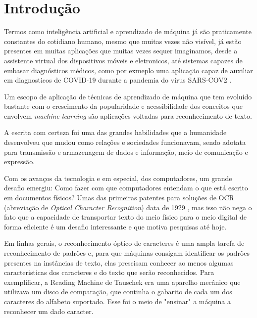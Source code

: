 
\chapter[Introdução]{Introdução}

Termos como inteligência artificial e aprendizado de máquina já são praticamente constantes do cotidiano humano, mesmo que muitas vezes não visível, já estão presentes em muitas aplicações que muitas vezes sequer imaginamos, desde a assistente virtual dos dispositivos móveis e eletronicos, até sistemas capazes de embasar diagnósticos médicos, como por exmeplo uma aplicação capaz de auxiliar em diagnosticos de COVID-19 durante a pandemia do vírus SARS-COV2 \cite{Zhao2021DeepLF}. 

Um escopo de aplicação de técnicas de aprendizado de máquina que tem evoluído bastante com o crescimento da popularidade e acessibilidade dos conceitos que envolvem \textit{machine learning} são aplicações voltadas para reconhecimento de texto.

A escrita com certeza foi uma das grandes habilidades que a humanidade desenvolveu que mudou como relações e sociedades funcionavam, sendo adotata para transmissão e armazenagem de dados e informação, meio de comunicação e expressão.

Com os avanços da tecnologia e em especial, dos computadores, um grande desafio emergiu: Como fazer com que computadores entendam o que está escrito em documentos físicos? Umas das primeiras patentes para soluções de OCR (abreviação de \textit{Optical Character Recognition}) data de 1929 \cite{readingMachine}, mas isso não nega o fato que a capacidade de transportar texto do meio físico para o meio digital de forma eficiente é um desafio interessante e que motiva pesquisas até hoje.

Em linhas gerais, o reconhecimento óptico de caracteres é uma ampla tarefa de reconhecimento de padrões e, para que máquinas consigam identificar os padrões presentes na instâncias de texto, elas prescisam conhecer ao menos algumas caracteristicas dos caracteres e do texto que serão reconhecidos. Para exemplificar, a Reading Machine de Tauschek \cite{readingMachine} era uma aparelho mecânico que utilizava um disco de comparação, que continha o gabarito de cada um dos caracteres do alfabeto suportado. Esse foi o meio de "ensinar" a máquina a reconhecer um dado caracter.

